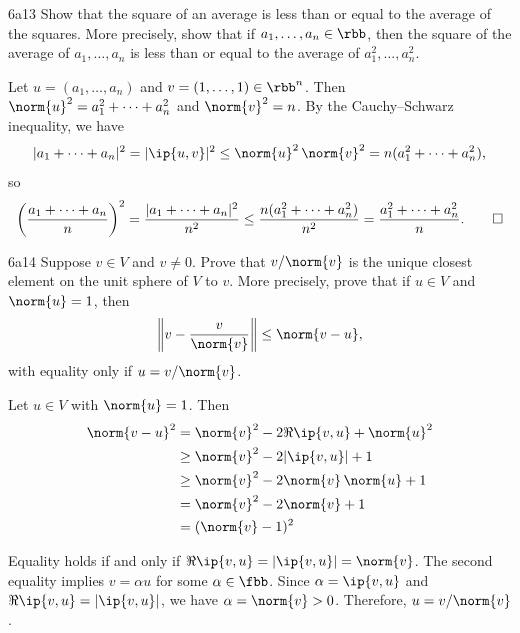 \begin{exercise}{6a13}
    Show that the square of an average is less than or equal to the average of the squares.
    More precisely, show that if $a_1, \ldots, a_n \in \rbb$, then the square of the average of $a_1, \ldots, a_n$ is less than or equal to the average of $a_1^2, \ldots, a_n^2$.

\end{exercise}

\begin{sol}
    Let $u = (a_1, \ldots, a_n)$ and $v = (1, \ldots, 1) \in \rbb^n$.
    Then $\norm{u}^2 = a_1^2 + \cdots + a_n^2$ and $\norm{v}^2 = n$.
    By the Cauchy--Schwarz inequality, we have
    \[
        |a_1 + \cdots + a_n|^2 = |\ip{u, v}|^2 \leq \norm{u}^2\,\norm{v}^2 = n(a_1^2 + \cdots + a_n^2),
    \]
    so
    \[
        \left(\frac{a_1 + \cdots + a_n}{n}\right)^2 = \frac{|a_1 + \cdots + a_n|^2}{n^2} \leq \frac{n(a_1^2 + \cdots + a_n^2)}{n^2} = \frac{a_1^2 + \cdots + a_n^2}{n}. \qedhere
    \]
\end{sol}

\begin{exercise}{6a14}
    Suppose $v \in V$ and $v \neq 0$.
    Prove that $v/\norm{v}$ is the unique closest element on the unit sphere of $V$ to $v$.
    More precisely, prove that if $u \in V$ and $\norm{u} = 1$, then
    \[
        \left\|v - \frac{v}{\norm{v}}\right\| \leq \norm{v - u},
    \]
    with equality only if $u = v/\norm{v}$.
\end{exercise}

\begin{sol}
    Let $u \in V$ with $\norm{u} = 1$.
    Then
    \begin{align*}
        \norm{v - u}^2 &= \norm{v}^2 - 2\Re\ip{v, u} + \norm{u}^2 \\
        &\geq \norm{v}^2 - 2|\ip{v, u}| + 1 \\
        &\geq \norm{v}^2 - 2\norm{v}\,\norm{u} + 1 \\
        &= \norm{v}^2 - 2\norm{v} + 1 \\
        &= (\norm{v} - 1)^2
    \end{align*}

    Equality holds if and only if $\Re\ip{v, u} = |\ip{v, u}| = \norm{v}$.
    The second equality implies $v = \alpha u$ for some $\alpha \in \fbb$.
    Since $\alpha = \ip{v, u}$ and $\Re\ip{v, u} = |\ip{v, u}|$, we have $\alpha = \norm{v} > 0$.
    Therefore, $u = v/\norm{v}$.
\end{sol}

